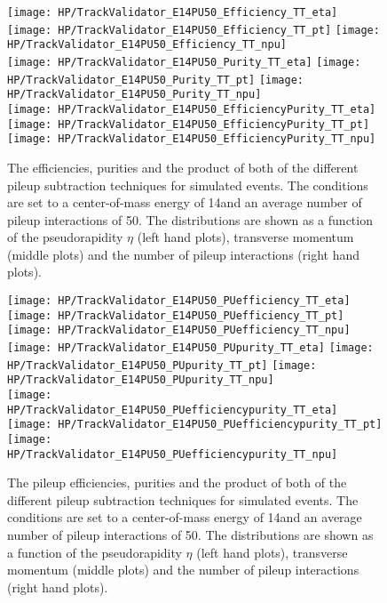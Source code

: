 \begin{figure}[!h]
  \centering
  \texttt{[image: HP/TrackValidator\_E14PU50\_Efficiency\_TT\_eta]}
  \texttt{[image: HP/TrackValidator\_E14PU50\_Efficiency\_TT\_pt]}
  \texttt{[image: HP/TrackValidator\_E14PU50\_Efficiency\_TT\_npu]}
   \\
  \texttt{[image: HP/TrackValidator\_E14PU50\_Purity\_TT\_eta]}
  \texttt{[image: HP/TrackValidator\_E14PU50\_Purity\_TT\_pt]}
  \texttt{[image: HP/TrackValidator\_E14PU50\_Purity\_TT\_npu]}
   \\
  \texttt{[image: HP/TrackValidator\_E14PU50\_EfficiencyPurity\_TT\_eta]}
  \texttt{[image: HP/TrackValidator\_E14PU50\_EfficiencyPurity\_TT\_pt]}
  \texttt{[image: HP/TrackValidator\_E14PU50\_EfficiencyPurity\_TT\_npu]}
  \caption[Efficiencies, purities and their product of the different pileup subtraction techniques for simulated \ttbar events with 14\TeV and PU=50]{The efficiencies, purities and the product of both of the different pileup subtraction techniques for simulated \ttbar events. The conditions are set to a center-of-mass energy of 14\TeV and an average number of pileup interactions of 50. The distributions are shown as a function of the pseudorapidity $\eta$ (left hand plots), transverse momentum (middle plots) and the number of pileup interactions (right hand plots).}
\end{figure}
\clearpage

\begin{figure}[!h]
  \centering
  \texttt{[image: HP/TrackValidator\_E14PU50\_PUefficiency\_TT\_eta]}
  \texttt{[image: HP/TrackValidator\_E14PU50\_PUefficiency\_TT\_pt]}
  \texttt{[image: HP/TrackValidator\_E14PU50\_PUefficiency\_TT\_npu]}
   \\
  \texttt{[image: HP/TrackValidator\_E14PU50\_PUpurity\_TT\_eta]}
  \texttt{[image: HP/TrackValidator\_E14PU50\_PUpurity\_TT\_pt]}
  \texttt{[image: HP/TrackValidator\_E14PU50\_PUpurity\_TT\_npu]}
   \\
  \texttt{[image: HP/TrackValidator\_E14PU50\_PUefficiencypurity\_TT\_eta]}
  \texttt{[image: HP/TrackValidator\_E14PU50\_PUefficiencypurity\_TT\_pt]}
  \texttt{[image: HP/TrackValidator\_E14PU50\_PUefficiencypurity\_TT\_npu]}
  \caption[Pileup efficiencies, purities and their product of the different pileup subtraction techniques for simulated \ttbar events with 14\TeV and PU=50]{The pileup efficiencies, purities and the product of both of the different pileup subtraction techniques for simulated \ttbar events. The conditions are set to a center-of-mass energy of 14\TeV and an average number of pileup interactions of 50. The distributions are shown as a function of the pseudorapidity $\eta$ (left hand plots), transverse momentum (middle plots) and the number of pileup interactions (right hand plots).}
\end{figure}
\clearpage

